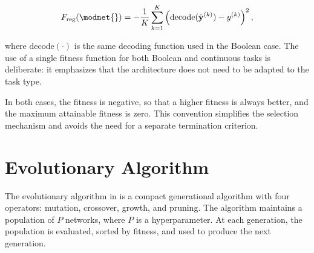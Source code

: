 \begin{equation}
  F_{\text{reg}}(\modnet{}) = -\frac{1}{K} \sum_{k=1}^{K}
    \left( \text{decode}(\hat{\mathbf{y}}^{(k)}) - y^{(k)} \right)^2,
  \label{eq:fitness-regression}
\end{equation}

where $\text{decode}(\cdot)$ is the same decoding function used in the
Boolean case. The use of a single fitness function for both Boolean
and continuous tasks is deliberate: it emphasizes that the architecture
does not need to be adapted to the task type.

\begin{remark}
In both cases, the fitness is negative, so that a higher fitness is
always better, and the maximum attainable fitness is zero. This
convention simplifies the selection mechanism and avoids the need for
a separate termination criterion.
\end{remark}

\section{Evolutionary Algorithm}
\label{sec:evolution}

The evolutionary algorithm in \modnet{} is a compact generational
algorithm with four operators: mutation, crossover, growth, and
pruning. The algorithm maintains a population of $P$ networks, where
$P$ is a hyperparameter. At each generation, the population is
evaluated, sorted by fitness, and used to produce the next generation.

